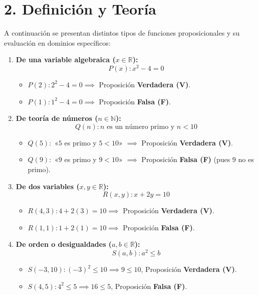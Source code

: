 \documentclass[11pt]{article}
\newenvironment{teoria}{\section*{2. Definición y Teoría}}{}
\newenvironment{ejemplo}[1]{\begin{tcolorbox}[colback=gray!5,colframe=gray!60!black,title=Ejemplo: #1]}{\end{tcolorbox}}
\begin{document}
\begin{teoria}
  \begin{ejemplo}{Ejemplos de Funciones Proposicionales de 1 y 2 Variables}
    A continuación se presentan distintos tipos de funciones proposicionales y su evaluación en dominios específicos:
    \begin{enumerate}
      \item \textbf{De una variable algebraica ($x \in \mathbb{R}$):}
            $$ P(x) : x^2 - 4 = 0 $$
            \begin{itemize}
              \item $P(2): 2^2 - 4 = 0 \implies$ Proposición \textbf{Verdadera (V)}.
              \item $P(1): 1^2 - 4 = 0 \implies$ Proposición \textbf{Falsa (F)}.
            \end{itemize}
      
      \item \textbf{De teoría de números ($n \in \mathbb{N}$):}
            $$ Q(n) : n \text{ es un número primo y } n < 10 $$
            \begin{itemize}
              \item $Q(5):$ «$5$ es primo y $5 < 10$» $\implies$ Proposición \textbf{Verdadera (V)}.
              \item $Q(9):$ «$9$ es primo y $9 < 10$» $\implies$ Proposición \textbf{Falsa (F)} (pues 9 no es primo).
            \end{itemize}

      \item \textbf{De dos variables ($x, y \in \mathbb{R}$):}
            $$ R(x, y) : x + 2y = 10 $$
            \begin{itemize}
              \item $R(4, 3): 4 + 2(3) = 10 \implies$ Proposición \textbf{Verdadera (V)}.
              \item $R(1, 1): 1 + 2(1) = 10 \implies$ Proposición \textbf{Falsa (F)}.
            \end{itemize}

      \item \textbf{De orden o desigualdades ($a, b \in \mathbb{R}$):}
            $$ S(a, b) : a^2 \leq b $$
            \begin{itemize}
              \item $S(-3, 10): (-3)^2 \leq 10 \implies 9 \leq 10$, Proposición \textbf{Verdadera (V)}.
              \item $S(4, 5): 4^2 \leq 5 \implies 16 \leq 5$, Proposición \textbf{Falsa (F)}.
            \end{itemize}
    \end{enumerate}
  \end{ejemplo}


\end{teoria}
\end{document}
